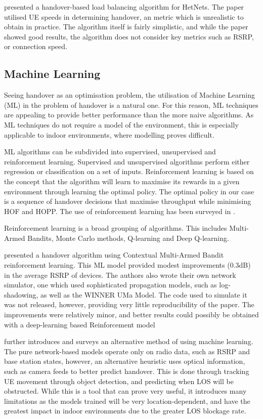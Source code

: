 \citet{hatipoglu_handover-based_2020} presented a handover-based load balancing algorithm for HetNets. The paper utilised UE speeds in determining handover, an metric which is unrealistic to obtain in practice. The algorithm itself is fairly simplistic, and while the paper showed good results, the algorithm does not consider key metrics such as RSRP, or connection speed.

\subsection{Machine Learning}
Seeing handover as an optimisation problem, the utilisation of Machine Learning (ML) in the problem of handover is a natural one. For this reason, ML techniques are appealing to provide better performance than the more naive algorithms. As ML techniques do not require a model of the environment, this is especially applicable to indoor environments, where modelling proves difficult.

ML algorithms can be subdivided into supervised, unsupervised and reinforcement learning. Supervised and unsupervised algorithms perform either regression or classification on a set of inputs. Reinforcement learning is based on the concept that the algorithm will learn to maximise its rewards in a given environment through learning the optimal policy. The optimal policy in our case is a sequence of handover decisions that maximise throughput while minimising HOF and HOPP. The use of reinforcement learning has been surveyed in \cite{mollel_survey_2021}.

Reinforcement learning is a broad grouping of algorithms. This includes Multi-Armed Bandits, Monte Carlo methods, Q-learning and Deep Q-learning.

\citet{yajnanarayana_5g_2020} presented a handover algorithm using Contextual Multi-Armed Bandit reinforcement learning. This ML model provided modest improvements (0.3dB) in the average RSRP of devices. The authors also wrote their own network simulator, one which used sophisticated propagation models, such as log-shadowing, as well as the WINNER UMa Model. The code used to simulate it was not released, however, providing very little reproducibility of the paper. The improvements were relatively minor, and better results could possibly be obtained with a deep-learning based Reinforcement model

\citet{mollel_survey_2021} further introduces and surveys an alternative method of using machine learning. The pure network-based models operate only on radio data, such as RSRP and base station states, however, an alternative heuristic uses optical information, such as camera feeds to better predict handover. This is done through tracking UE movement through object detection, and predicting when LOS will be obstructed. While this is a tool that can prove very useful, it introduces many limitations as the models trained will be very location-dependent, and have the greatest impact in indoor environments due to the greater LOS blockage rate.

